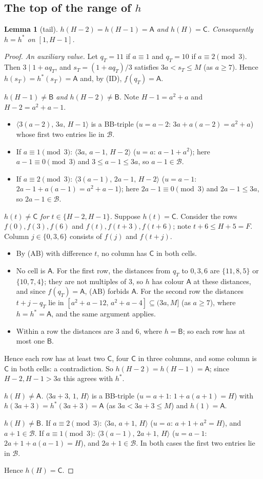 \documentclass[11pt]{amsart}
\newtheorem{lemma}[theorem]{Lemma}
\theoremstyle{definition}
\theoremstyle{remark}
\newcommand{\cA}{\mathsf{A}}\newcommand{\cB}{\mathsf{B}}\newcommand{\cC}{\mathsf{C}}
\newcommand{\tri}[3]{\langle #1,\,#2,\,#3\rangle}
\newcommand{\Bset}{\mathcal B}
\begin{document}
\subsection{The top of the range of $h$}
\begin{lemma}[tail]\label{lem:tail}
$h(H-2)=h(H-1)=\cA$ and $h(H)=\cC$. Consequently $h=h^\ast$ on $[1,H-1]$.
\end{lemma}
\begin{proof}
\emph{An auxiliary value.} Let $q_T=11$ if $a\equiv1$ and $q_T=10$ if $a\equiv2\pmod 3$. Then $3\mid1+aq_T$, and
$s_T=(1+aq_T)/3$ satisfies $3a<s_T\le M$ (as $a\ge7$). Hence $h(s_T)=h^\ast(s_T)=\cA$ and, by (ID), $f(q_T)=\cA$.

\emph{$h(H-1)\ne\cB$ and $h(H-2)\ne\cB$.} Note $H-1=a^2+a$ and $H-2=a^2+a-1$.
\begin{itemize}
\item $\tri{3(a-2)}{3a}{H-1}$ is a BB-triple ($u=a-2$: $3a+a(a-2)=a^2+a$) whose first two entries lie in $\Bset$.
\item If $a\equiv1\pmod 3$: $\tri{3a}{a-1}{H-2}$ ($u=a$: $a-1+a^2$); here $a-1\equiv0\pmod 3$ and $3\le a-1\le3a$, so
$a-1\in\Bset$.
\item If $a\equiv2\pmod 3$: $\tri{3(a-1)}{2a-1}{H-2}$ ($u=a-1$: $2a-1+a(a-1)=a^2+a-1$); here $2a-1\equiv0\pmod 3$
and $2a-1\le3a$, so $2a-1\in\Bset$.
\end{itemize}

\emph{$h(t)\ne\cC$ for $t\in\{H-2,H-1\}$.} Suppose $h(t)=\cC$. Consider the rows $f(0),f(3),f(6)$ and
$f(t),f(t+3),f(t+6)$; note $t+6\le H+5=F$. Column $j\in\{0,3,6\}$ consists of $f(j)$ and $f(t+j)$.
\begin{itemize}
\item By (AB) with difference $t$, no column has $\cC$ in both cells.
\item No cell is $\cA$. For the first row, the distances from $q_T$ to $0,3,6$ are $\{11,8,5\}$ or $\{10,7,4\}$; they
are not multiples of $3$, so $h$ has colour $\cA$ at these distances, and since $f(q_T)=\cA$, (AB) forbids $\cA$. For
the second row the distances $t+j-q_T$ lie in $[a^2+a-12,\,a^2+a-4]\subseteq(3a,M]$ (as $a\ge7$), where $h=h^\ast=\cA$,
and the same argument applies.
\item Within a row the distances are $3$ and $6$, where $h=\cB$; so each row has at most one $\cB$.
\end{itemize}
Hence each row has at least two $\cC$, four $\cC$ in three columns, and some column is $\cC$ in both cells: a
contradiction. So $h(H-2)=h(H-1)=\cA$; since $H-2,H-1>3a$ this agrees with $h^\ast$.

\emph{$h(H)\ne\cA$.} $\tri{3a+3}{1}{H}$ is a BB-triple ($u=a+1$: $1+a(a+1)=H$) with $h(3a+3)=h^\ast(3a+3)=\cA$ (as
$3a<3a+3\le M$) and $h(1)=\cA$.

\emph{$h(H)\ne\cB$.} If $a\equiv2\pmod 3$: $\tri{3a}{a+1}{H}$ ($u=a$: $a+1+a^2=H$), and $a+1\in\Bset$. If
$a\equiv1\pmod 3$: $\tri{3(a-1)}{2a+1}{H}$ ($u=a-1$: $2a+1+a(a-1)=H$), and $2a+1\in\Bset$. In both cases the first two
entries lie in $\Bset$.

Hence $h(H)=\cC$.
\end{proof}
\end{document}
